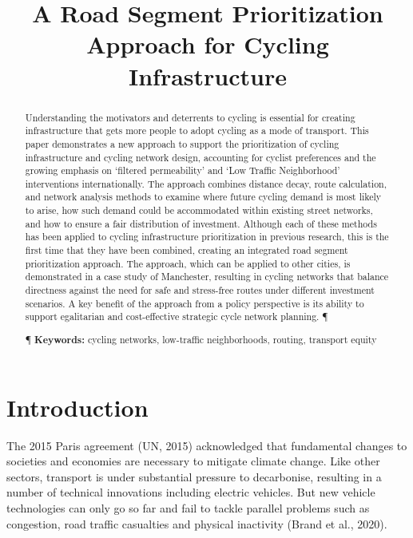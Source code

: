 \documentclass[
]{article}
\title{A Road Segment Prioritization Approach for Cycling Infrastructure}
\author{}
\date{\vspace{-2.5em}}
\begin{document}
\maketitle
\begin{abstract}
Understanding the motivators and deterrents to cycling is essential for creating infrastructure that gets more people to adopt cycling as a mode of transport. This paper demonstrates a new approach to support the prioritization of cycling infrastructure and cycling network design, accounting for cyclist preferences and the growing emphasis on `filtered permeability' and `Low Traffic Neighborhood' interventions internationally. The approach combines distance decay, route calculation, and network analysis methods to examine where future cycling demand is most likely to arise, how such demand could be accommodated within existing street networks, and how to ensure a fair distribution of investment. Although each of these methods has been applied to cycling infrastructure prioritization in previous research, this is the first time that they have been combined, creating an integrated road segment prioritization approach. The approach, which can be applied to other cities, is demonstrated in a case study of Manchester, resulting in cycling networks that balance directness against the need for safe and stress-free routes under different investment scenarios. A key benefit of the approach from a policy perspective is its ability to support egalitarian and cost-effective strategic cycle network planning. ¶ \par ¶ \textbf{Keywords:} cycling networks, low-traffic neighborhoods, routing, transport equity
\end{abstract}

\hypertarget{introduction}{%
\section{Introduction}\label{introduction}}

The 2015 Paris agreement (UN, 2015) acknowledged that fundamental changes to societies and economies are necessary to mitigate climate change.
Like other sectors, transport is under substantial pressure to decarbonise, resulting in a number of technical innovations including electric vehicles.
But new vehicle technologies can only go so far and fail to tackle parallel problems such as congestion, road traffic casualties and physical inactivity (Brand et al., 2020).
\end{document}
